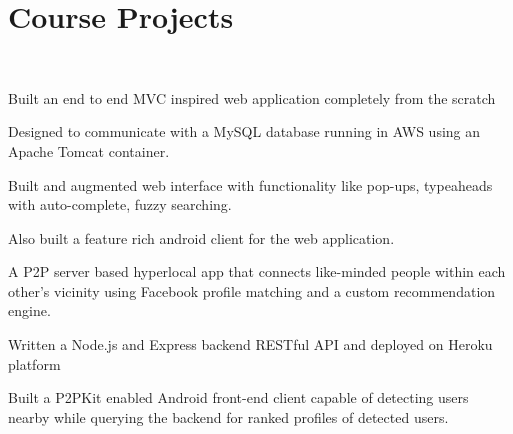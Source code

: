 \documentclass[]{base}
\begin{document}
\begin{minipage}[t]{0.66\textwidth}
	
	\section{Course Projects}
	 \\
	\begin{tightemize}
		\item Built an end to end MVC inspired web application completely from the scratch
		\item Designed to communicate with a MySQL database running in AWS using an Apache Tomcat container.
		\item Built and augmented web interface with functionality like pop-ups, typeaheads with auto-complete, fuzzy searching.
		\item Also built a feature rich android client for the web application.
	\end{tightemize}
	\sectionsep
	
	\begin{tightemize}
		\item A P2P server based hyperlocal app that connects like-minded people within each other’s vicinity using Facebook profile matching and a custom recommendation engine.
		\item Written a Node.js and Express backend RESTful API and deployed on Heroku platform
		\item Built a P2PKit enabled Android front-end client capable of detecting users nearby while querying the backend for ranked profiles of detected users.
	\end{tightemize}
	
	\sectionsep\
	
\end{minipage} 
\end{document}
